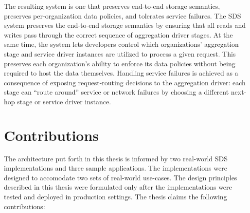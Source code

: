 The resulting system is one that preserves end-to-end storage semantics,
preserves per-organization data policies, and tolerates service failures.
The SDS system preserves the end-to-end storage semantics by ensuring that
all reads and writes pass through the correct sequence of aggregation driver
stages.  At the same time, the system
lets developers control which organizations' aggregation stage and service driver
instances are utilized to process a given request.  This preserves each
organization's ability to enforce its data policies without being required to
host the data themselves.  Handling service failures is achieved as a
consequence of exposing request-routing decisions to the aggregation driver:
each stage can ``route around'' service or network
failures by choosing a different next-hop stage or service driver instance.

\section{Contributions}

The architecture put forth in this thesis is informed by two real-world SDS
implementations and three sample applications.  The implementations were 
designed to accomodate two sets of real-world use-cases.
The design principles described in this thesis 
were formulated only after the implementations were tested and
deployed in production settings.  The thesis claims the following contributions:

